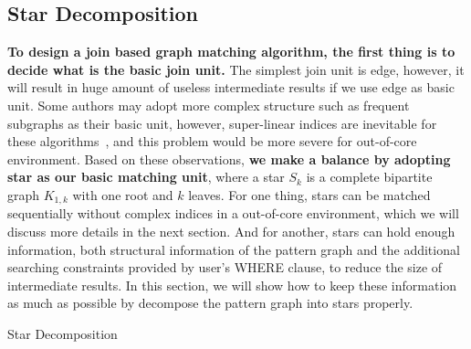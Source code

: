 \subsection{Star Decomposition}\label{sec:star_decomposition}
\textbf{To design a join based graph matching algorithm, the first thing is to decide what is the basic join unit.}
The simplest join unit is edge, however, it will result in huge amount of useless intermediate results if we use edge as basic unit.
Some authors may adopt more complex structure such as frequent subgraphs as their basic unit,
however, super-linear indices are inevitable for these algorithms~\cite{DBLP:journals/pvldb/SunWWSL12},
and this problem would be more severe for out-of-core environment.
Based on these observations, \textbf{we make a balance by adopting star as our basic matching unit},
where a star $S_k$ is a complete bipartite graph $K_{1,k}$ with one root and $k$ leaves.
For one thing, stars can be matched sequentially without complex indices in a out-of-core environment,
which we will discuss more details in the next section.
And for another, stars can hold enough information, both structural information of the pattern graph and the additional searching constraints provided by user's WHERE clause, to reduce the size of intermediate results.
In this section, we will show how to keep these information as much as possible by decompose the pattern graph into stars properly.

\begin{algorithm}[ht]
  \caption{Star Decomposition}\label{alg:decompose_stars}
\end{algorithm}


